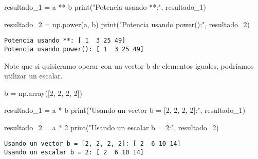 \documentclass[
  letterpaper,
  DIV=11,
  numbers=noendperiod]{scrreprt}
\newenvironment{Shaded}{\begin{snugshade}}{\end{snugshade}}
\newcommand{\BuiltInTok}[1]{\textcolor[rgb]{0.00,0.23,0.31}{#1}}
\newcommand{\DecValTok}[1]{\textcolor[rgb]{0.68,0.00,0.00}{#1}}
\newcommand{\NormalTok}[1]{\textcolor[rgb]{0.00,0.23,0.31}{#1}}
\newcommand{\OperatorTok}[1]{\textcolor[rgb]{0.37,0.37,0.37}{#1}}
\newcommand{\StringTok}[1]{\textcolor[rgb]{0.13,0.47,0.30}{#1}}
\begin{document}
\begin{Shaded}
\begin{Highlighting}[]
\NormalTok{resultado\_1 }\OperatorTok{=}\NormalTok{ a }\OperatorTok{**}\NormalTok{ b}
\BuiltInTok{print}\NormalTok{(}\StringTok{"Potencia usando **:"}\NormalTok{, resultado\_1) }

\NormalTok{resultado\_2 }\OperatorTok{=}\NormalTok{ np.power(a, b)}
\BuiltInTok{print}\NormalTok{(}\StringTok{"Potencia usando power():"}\NormalTok{, resultado\_2) }
\end{Highlighting}
\end{Shaded}

\begin{verbatim}
Potencia usando **: [ 1  3 25 49]
Potencia usando power(): [ 1  3 25 49]
\end{verbatim}

\begin{tcolorbox}[enhanced jigsaw, colframe=quarto-callout-note-color-frame, leftrule=.75mm, titlerule=0mm, left=2mm, bottomtitle=1mm, arc=.35mm, opacitybacktitle=0.6, toptitle=1mm, colbacktitle=quarto-callout-note-color!10!white, opacityback=0, breakable, title=\textcolor{quarto-callout-note-color}{\faInfo}\hspace{0.5em}{Note}, toprule=.15mm, rightrule=.15mm, colback=white, coltitle=black, bottomrule=.15mm]

Note que si quisieramo operar con un vector b de elementos iguales,
podríamos utilizar un escalar.

\end{tcolorbox}

\begin{Shaded}
\begin{Highlighting}[]
\NormalTok{b }\OperatorTok{=}\NormalTok{ np.array([}\DecValTok{2}\NormalTok{, }\DecValTok{2}\NormalTok{, }\DecValTok{2}\NormalTok{, }\DecValTok{2}\NormalTok{])}

\NormalTok{resultado\_1 }\OperatorTok{=}\NormalTok{ a }\OperatorTok{*}\NormalTok{ b}
\BuiltInTok{print}\NormalTok{(}\StringTok{"Usando un vector b = [2, 2, 2, 2]:"}\NormalTok{, resultado\_1) }

\NormalTok{resultado\_2 }\OperatorTok{=}\NormalTok{ a }\OperatorTok{*} \DecValTok{2}
\BuiltInTok{print}\NormalTok{(}\StringTok{"Usando un escalar b = 2:"}\NormalTok{, resultado\_2) }
\end{Highlighting}
\end{Shaded}

\begin{verbatim}
Usando un vector b = [2, 2, 2, 2]: [ 2  6 10 14]
Usando un escalar b = 2: [ 2  6 10 14]
\end{verbatim}
\end{document}
